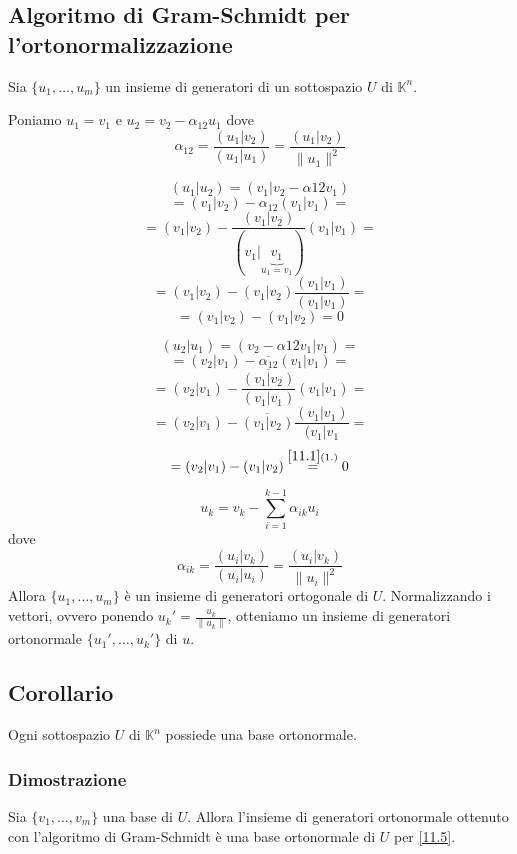 \documentclass[a4paper]{article}
\theoremstyle{break}
\theoremstyle{break}
\theoremstyle{break}
\theoremstyle{break}
\begin{document}
\subsection{Algoritmo di Gram-Schmidt per l'ortonormalizzazione}
Sia \( \{u_1, \ldots, u_m\}  \) un insieme di generatori di un sottospazio \( U \) di
\( \mathbb{K}^n \).

\noindent Poniamo \( u_1 = v_1 \) e \( u_2 = v_2 - \alpha_{12} u_1 \) dove
\[
  \alpha_{12} = \frac{(u_1|v_2)}{(u_1|u_1)} = \frac{(u_1|v_2)}{\|u_1\|^2}
\] 

\[
  (u_1|u_2) = (v_1|v_2 - \alpha{12}v_1) 
\] 
\[
= (v_1|v_2) - \alpha_{12}(v_1|v_1) = 
\] 
\[
  = (v_1|v_2) - \frac{(v_1|v_2)}{(v_1|\underbrace{v_1}_{u_1 = v_1})}(v_1|v_1) =
\] 
\[
= (v_1|v_2) - (v_1|v_2)\frac{(v_1|v_1)}{(v_1|v_1)} =
\] 
\[
= (v_1|v_2) - (v_1|v_2) = 0
\] 

\vspace{2em}
\[
  (u_2|u_1) = (v_2 - \alpha{12}v_1 | v_1) =
\] 
\[
  = (v_2|v_1) - \overline{\alpha_{12}}(v_1|v_1) =
\] 
\[
  = (v_2|v_1) - \frac{\overline{(v_1|v_2)}}{(v_1|v_1)}(v_1|v_1) =
\] 
\[
  = (v_2|v_1) - \overline{(v_1|v_2)} \frac{(v_1|v_1)}{(v_1|v_1} =
\] 
\[
  = (v_2|v_1) - (v_1|v_2) \stackrel{\ref{11.1}(1.)}{=} 0
\] 

\vspace{2em}
\[
u_k = v_k - \sum_{i=1}^{k-1} \alpha_{ik}u_i
\] 
dove
\[
  \alpha_{ik} = \frac{(u_i|v_k)}{(u_i|u_i)} = \frac{(u_i|v_k)}{\|u_i\|^2}
\] 
Allora \( \{u_1, \ldots, u_m\} \) è un insieme di generatori ortogonale di \( U \).
Normalizzando i vettori, ovvero ponendo \( u_k' = \frac{u_k}{\|u_k\|} \), otteniamo
un insieme di generatori ortonormale \( \{u_1', \ldots, u_k'\} \) di \( u \).

\subsection{Corollario}
Ogni sottospazio \( U \) di \( \mathbb{K}^n \) possiede una base ortonormale.

\subsubsection{Dimostrazione}
Sia \( \{v_1, \ldots, v_m\} \) una base di \( U \). Allora l'insieme di generatori
ortonormale ottenuto con l'algoritmo di Gram-Schmidt è una base ortonormale di \( U \)
per \ref{11.5}.
\end{document}
